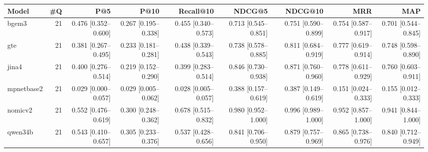 \begin{tabular}{lrrrrrrrr}
\toprule
Model & \#Q & P@5 & P@10 & Recall@10 & NDCG@5 & NDCG@10 & MRR & MAP \\
\midrule
bgem3 & 21 & 0.476 [0.352–0.600] & 0.267 [0.195–0.338] & 0.455 [0.340–0.573] & 0.713 [0.545–0.851] & 0.751 [0.590–0.899] & 0.754 [0.587–0.917] & 0.701 [0.544–0.845] \\
gte & 21 & 0.381 [0.267–0.495] & 0.233 [0.181–0.281] & 0.438 [0.339–0.543] & 0.738 [0.578–0.885] & 0.811 [0.684–0.919] & 0.777 [0.619–0.914] & 0.748 [0.598–0.890] \\
jina4 & 21 & 0.400 [0.276–0.514] & 0.219 [0.152–0.290] & 0.399 [0.283–0.514] & 0.846 [0.730–0.938] & 0.871 [0.760–0.960] & 0.778 [0.611–0.929] & 0.760 [0.603–0.911] \\
mpnetbase2 & 21 & 0.029 [0.000–0.057] & 0.029 [0.005–0.062] & 0.028 [0.005–0.057] & 0.388 [0.157–0.619] & 0.387 [0.149–0.619] & 0.151 [0.024–0.333] & 0.155 [0.012–0.333] \\
nomicv2 & 21 & 0.552 [0.476–0.619] & 0.300 [0.248–0.362] & 0.678 [0.515–0.832] & 0.980 [0.952–1.000] & 0.996 [0.989–1.000] & 0.952 [0.857–1.000] & 0.941 [0.844–1.000] \\
qwen34b & 21 & 0.543 [0.410–0.657] & 0.305 [0.233–0.376] & 0.537 [0.428–0.656] & 0.841 [0.706–0.950] & 0.879 [0.757–0.969] & 0.865 [0.738–0.976] & 0.840 [0.712–0.949] \\
\bottomrule
\end{tabular}
